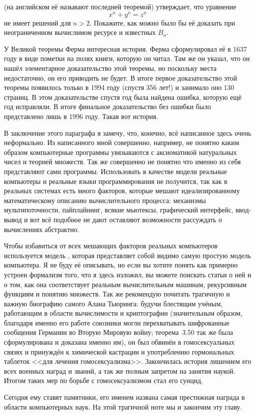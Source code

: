 \begin{exercise}
 (на английском её называют последней теоремой) утверждает, что уравнение
$$x^n + y^n = z^n$$
не имеет решений для $n>2$. Покажите, как можно было бы её доказать при неограниченном вычислимом ресурсе и известных $B_n$.
\end{exercise}

У Великой теоремы Ферма интересная история. Ферма сформулировал её в 1637 году в виде пометки на полях книги, которую он читал. Там же он указал, что он нашёл элементарное доказательство этой теоремы, но поскольку места недостаточно, он его приводить не будет. В итоге первое доказательство этой теоремы появилось только в 1994 году (спустя 356 лет!) и занимало оно 130 страниц. В этом доказательстве спустя год была найдена ошибка, которую ещё год исправляли. В итоге финальное доказательство без ошибки было представлено лишь в 1996 году. Такая вот история.

В заключение этого параграфа я замечу, что, конечно, всё написанное здесь очень неформально. Из написанного мной совершенно, например, не понятно каким образом компьютерные программы увязываются с аксиоматикой натуральных чисел и теорией множеств. Так же совершенно не понятно что именно из себя представляют сами программы. Использовать в качестве модели реальные компьютеры и реальные языки программирования не получится, так как в реальных системах есть много факторов, которые мешают идеализированному математическому описанию вычислительного процесса: механизмы мультипоточности, пайплайнинг, всякие мьютексы, графический интерфейс, ввод-вывод и вот всё подобное не дают оставляют возможности рассуждать о вычислениях абстрактно.

Чтобы избавиться от всех мешающих факторов реальных компьютеров используется модель , которая представляет собой видимо самую простую модель компьютера. Я не буду её описывать, но если вы хотите понять как примерно устроен формализм того, что я здесь изложил, вы можете поискать статьи о ней и о том, как она соответствует реальным вычислительным машинам, рекурсивным функциям и понятию множеств. Так же рекомендую почитать трагичную и важную биографию самого Алана Тьюринга: будучи блестящим учёным, работающим в области вычислимости и криптографии (значительным образом, благодаря именно его работе союзники могли перехватывать шифрованные сообщения Германии во Вторую Мировую войну; теорема~3.50 так же была сформулирована и доказана именно им), он был обвинён в гомосексуальных связях и принуждён к химической кастрации и употреблению гормональных таблеток <<для лечения гомосексуализма>>. Закончилась история лишением его всех военных наград и званий, а так же полным запретом на занятия наукой. Итогом таких мер по борьбе с гомосексуализмом стал его суицид.

Сегодня ему ставят памятники, его именем названа самая престижная награда в области компьютерных наук. На этой трагичной ноте мы и закончим эту главу.
